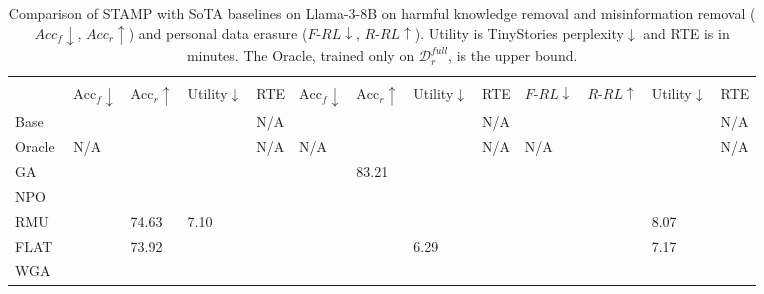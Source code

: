 \begin{table}[htbp]
\centering
\caption{Comparison of STAMP with SoTA baselines on Llama-3-8B on harmful knowledge removal and misinformation removal ($Acc_\textit{f}\!\downarrow$, $Acc_\textit{r}\!\uparrow$) and personal data erasure ($F\text{-}RL\!\downarrow$, $R\text{-}RL\!\uparrow$). Utility is TinyStories perplexity$\downarrow$ and RTE is in minutes. The Oracle, trained only on $\mathcal{D}_r^{\textit{full}}$, is the upper bound.}
\label{tab:STAMP-Comparison}
\renewcommand{\arraystretch}{1.05}
{\small
\begin{tabularx}{\textwidth}{l|*{4}{>{\centering\arraybackslash}X}|*{4}{>{\centering\arraybackslash}X}|*{4}{>{\centering\arraybackslash}X}}
\Xhline{1.15pt}
\multirow{2}{*}{\vspace{-0.2cm}\textbf{Method}}  &
\multicolumn{4}{c|}{\textbf{Harmful Knowledge Removal}} &
\multicolumn{4}{c|}{\textbf{Misinformation Removal}} &
\multicolumn{4}{c}{\textbf{Personal Data Erasure}} \\
\cmidrule(lr){2-5}\cmidrule(lr){6-9}\cmidrule(lr){10-13}
& $\mathrm{Acc}_\textit{f}{\downarrow}$ & $\mathrm{Acc}_\textit{r}{\uparrow}$ & Utility$\downarrow$ & RTE 
& $\mathrm{Acc}_\textit{f}{\downarrow}$ & $\mathrm{Acc}_\textit{r}{\uparrow}$ & Utility$\downarrow$ & RTE 
& $F\text{-}RL{\downarrow}$ & $R\text{-}RL{\uparrow}$ & Utility$\downarrow$ & RTE  \\
\Xhline{1.15pt}
Base
  & 75.30 & 78.50 & 5.90 & N/A
  & 83.70 & 86.30 & 5.75 & N/A
  & 0.87  & 0.89  & 5.01 & N/A \\
\rowcolor{gray!15}
Oracle
  & N/A    & 77.37 & 6.10 & N/A
  & N/A    & 85.30 & 5.25 & N/A
  & N/A    & 0.90  & 5.01 & N/A \\
\midrule
GA~\cite{yao2024large}
  & 0.00 & 73.27 & 11.27 & 12.25
  & 0.00 & \colorbox{yellow!40}{83.21} & 10.26 & 6.58
  & 0.13 & 0.81  & 10.17 & 10.41 \\
\rowcolor{gray!15}
NPO~\cite{zhang2024negative}
  & 0.00 & 71.37 &  9.27 & 11.17
  & 0.10 & 80.60 & 11.27 & 6.32
  & 0.27 & 0.83  & 10.00 & 9.48 \\
RMU~\cite{li2024wmdp}
  & 0.00 & \colorbox{green!30}{74.63} &  {7.10} & 12.50
  & 0.27 & 82.17 &  8.10 & 6.00
  & 0.16 & 0.75  & {8.07} & 9.36\\
\rowcolor{gray!15}
FLAT~\cite{wang2024llm}
  & 0.01 & \colorbox{yellow!40}{73.92} &  8.36 & 12.13
  & 1.30 & 80.01 &  \colorbox{yellow!40}{6.29} & 7.12
  & 0.33 & 0.79  &  \colorbox{yellow!40}{7.17} & 11.25\\
WGA~\cite{wang2025rethinking}

\end{tabularx}}
\end{table}
